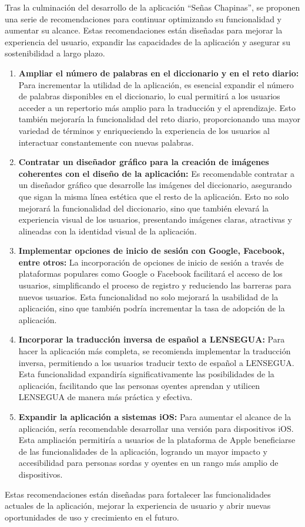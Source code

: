 
Tras la culminación del desarrollo de la aplicación ``Señas Chapinas'', se proponen una serie de recomendaciones para continuar optimizando su funcionalidad y aumentar su alcance. Estas recomendaciones están diseñadas para mejorar la experiencia del usuario, expandir las capacidades de la aplicación y asegurar su sostenibilidad a largo plazo.

\begin{enumerate}
    \item \textbf{Ampliar el número de palabras en el diccionario y en el reto diario:} 
    Para incrementar la utilidad de la aplicación, es esencial expandir el número de palabras disponibles en el diccionario, lo cual permitirá a los usuarios acceder a un repertorio más amplio para la traducción y el aprendizaje. Esto también mejoraría la funcionalidad del reto diario, proporcionando una mayor variedad de términos y enriqueciendo la experiencia de los usuarios al interactuar constantemente con nuevas palabras.

    \item \textbf{Contratar un diseñador gráfico para la creación de imágenes coherentes con el diseño de la aplicación:} 
    Es recomendable contratar a un diseñador gráfico que desarrolle las imágenes del diccionario, asegurando que sigan la misma línea estética que el resto de la aplicación. Esto no solo mejorará la funcionalidad del diccionario, sino que también elevará la experiencia visual de los usuarios, presentando imágenes claras, atractivas y alineadas con la identidad visual de la aplicación.

    \item \textbf{Implementar opciones de inicio de sesión con Google, Facebook, entre otros:} 
    La incorporación de opciones de inicio de sesión a través de plataformas populares como Google o Facebook facilitará el acceso de los usuarios, simplificando el proceso de registro y reduciendo las barreras para nuevos usuarios. Esta funcionalidad no solo mejorará la usabilidad de la aplicación, sino que también podría incrementar la tasa de adopción de la aplicación.

    \item \textbf{Incorporar la traducción inversa de español a LENSEGUA:} 
    Para hacer la aplicación más completa, se recomienda implementar la traducción inversa, permitiendo a los usuarios traducir texto de español a LENSEGUA. Esta funcionalidad expandiría significativamente las posibilidades de la aplicación, facilitando que las personas oyentes aprendan y utilicen LENSEGUA de manera más práctica y efectiva.

    \item \textbf{Expandir la aplicación a sistemas iOS:} 
    Para aumentar el alcance de la aplicación, sería recomendable desarrollar una versión para dispositivos iOS. Esta ampliación permitiría a usuarios de la plataforma de Apple beneficiarse de las funcionalidades de la aplicación, logrando un mayor impacto y accesibilidad para personas sordas y oyentes en un rango más amplio de dispositivos.
\end{enumerate}

Estas recomendaciones están diseñadas para fortalecer las funcionalidades actuales de la aplicación, mejorar la experiencia de usuario y abrir nuevas oportunidades de uso y crecimiento en el futuro.
